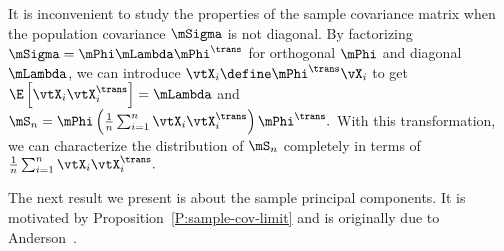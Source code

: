 It is inconvenient to study the properties of the sample covariance matrix when the population covariance
\(
    \mSigma
\)
is not diagonal.  By factorizing
\(
    \mSigma
    =
    \mPhi
    \mLambda
    \mPhi^\trans
\)
for orthogonal $\mPhi$ and diagonal $\mLambda$, we can introduce
\(
    \vtX_i
    \define
    \mPhi^\trans \vX_i
\)
to get
\(
    \E \left[
        \vtX_i
        \vtX_i^\trans
    \right]
    =
    \mLambda
\)
and
\(
    \mS_n
    =
    \mPhi
    \left(
        \frac{1}{n}
        \sum_{i=1}^n
            \vtX_i \vtX_i^\trans
    \right)
    \mPhi^\trans.
\)
With this transformation, we can characterize the distribution of $\mS_n$ completely in terms of
\(
    \frac{1}{n}
    \sum_{i=1}^n
        \vtX_i \vtX_i^\trans.
\)


The next result we present is about the sample principal components.  It is motivated by Proposition~\ref{P:sample-cov-limit} and is originally due to Anderson~\cite{anderson1963atp}.

